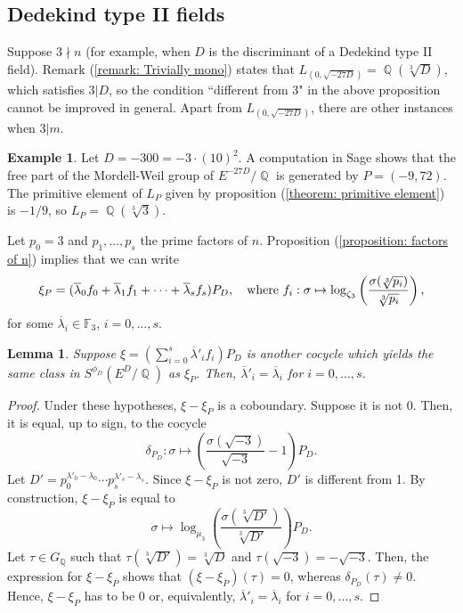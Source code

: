 \documentclass[oneside]{amsart}
\newcommand{\embrace}[3]{\left#1 #3 \right#2}
\newcommand{\lpar}[1]{\embrace{(}{)}{#1}}
\DeclareMathOperator{\QQ}{\mathbb{Q}}
\newtheorem{lemma}[X]{Lemma}
\theoremstyle{definition}
\newtheorem{example}[X]{Example}
\begin{document}
\subsection{Dedekind type II fields}
\label{section: Dedekind II}
Suppose $3 \nmid n$ (for example, when $D$ is the discriminant of a Dedekind type II field). Remark (\ref{remark: Trivially mono}) states that $L_{(0, \sqrt{-27D})} = \QQ(\sqrt[3]{D})$, which satisfies $3|D$, so the condition ``different from 3" in the above proposition cannot be improved in general. Apart from $L_{(0, \sqrt{-27D})}$, there are other instances when $3|m$.
\begin{example}
    Let $D = -300 = -3\cdot(10)^2$. A computation in Sage \cite{sagemath} shows that the free part of the Mordell-Weil group of $E^{-27D}/\QQ$ is generated by $P = (-9, 72)$. The primitive element of $L_P$ given by proposition (\ref{theorem: primitive element}) is $-1/9$, so $L_P = \QQ(\sqrt[3]{3})$.
\end{example}

Let $p_0 = 3$ and $p_1,\dots, p_s$ the prime factors of $n$. Proposition (\ref{proposition: factors of n}) implies that we can write
\begin{equation}
    \label{equation: Cocycle expression}
    \xi_P = (\overline{\lambda}_0f_0 + \overline{\lambda}_1f_1 + \cdots + \overline{\lambda}_{s}f_{s})P_D, \quad \textnormal{where }f_i: \sigma \mapsto \log_{\zeta_3}\lpar{\frac{\sigma(\sqrt[3]{p_i})}{\sqrt[3]{p_i}}},
\end{equation}
for some $\overline{\lambda}_i \in \mathbb{F}_3$, $i = 0, \dots, s$. 
\begin{lemma}
    \label{lemma: unicity of coefficients}
    Suppose $\xi = (\sum_{i = 0}^{s}\overline{\lambda}'_if_i)P_D$ is another cocycle which yields the same class in $S^{\phi_D}(E^D/\QQ)$ as $\xi_{P}$. Then, $\overline{\lambda}'_i = \overline{\lambda}_i$ for $i = 0,\dots, s$.
\end{lemma}
\begin{proof}
    Under these hypotheses, $\xi - \xi_P$ is a coboundary. Suppose it is not 0. Then, it is equal, up to sign, to the cocycle 
    $$
    \delta_{P_D} : \sigma \mapsto \lpar{\frac{\sigma(\sqrt{-3})}{\sqrt{-3}} - 1}P_D.
    $$
    Let $D' = p_0^{\lambda'_0 - \lambda_0}\cdots p_s^{\lambda'_s - \lambda_s}$. Since $\xi - \xi_P$ is not zero, $D'$ is different from 1. By construction, $\xi - \xi_P$ is equal to 
    $$
    \sigma \mapsto \log_{\mu_3}\lpar{\frac{\sigma(\sqrt[3]{D'})}{\sqrt[3]{D'}}}P_D.
    $$
    Let $\tau \in G_{\QQ}$ such that $\tau(\sqrt[3]{D'}) = \sqrt[3]{D}$ and $\tau(\sqrt{-3}) = -\sqrt{-3}$. Then, the expression for $\xi - \xi_P$ shows that $(\xi - \xi_P)(\tau) = 0$, whereas $\delta_{P_D}(\tau)\neq 0$. Hence, $\xi - \xi_P$ has to be 0 or, equivalently, $\overline{\lambda}'_i = \overline{\lambda}_i$ for $i = 0,\dots, s$.
\end{proof}
\end{document}
